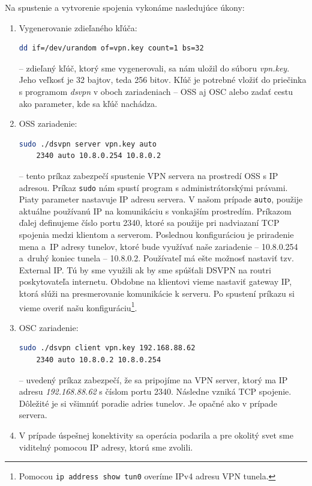 Na spustenie a vytvorenie spojenia vykonáme nasledujúce úkony:
\begin{enumerate}
	\item Vygenerovanie zdieľaného kľúča:\begin{lstlisting}[language=bash]
		dd if=/dev/urandom of=vpn.key count=1 bs=32
	\end{lstlisting} 
-- zdieľaný kľúč, ktorý sme vygenerovali, sa nám uložil do súboru \textit{vpn.key}. Jeho veľkosť je 32 bajtov, teda 256 bitov. Kľúč je potrebné vložiť do priečinka s programom \textit{dsvpn} v oboch zariadeniach -- OSS aj OSC alebo zadať cestu ako parameter, kde sa kľúč nachádza.
	\item OSS zariadenie: \begin{lstlisting}[language=bash] 
	sudo ./dsvpn server vpn.key auto 
	2340 auto 10.8.0.254 10.8.0.2
	\end{lstlisting} 
-- tento príkaz zabezpečí spustenie VPN servera na prostredí OSS s IP adresou. Príkaz \lstinline|sudo| nám spustí program s administrátorskými právami. Piaty parameter nastavuje IP adresu servera. V našom prípade \lstinline|auto|, použije aktuálne používanú IP na komunikáciu s vonkajším prostredím. Príkazom ďalej definujeme číslo portu 2340, ktoré sa použije pri nadviazaní TCP spojenia medzi klientom a serverom. Poslednou konfiguráciou je priradenie mena a~IP adresy tunelov, ktoré bude využívať naše zariadenie -- 10.8.0.254 a~druhý koniec tunela -- 10.8.0.2. Používateľ má ešte možnosť nastaviť tzv. External IP. Tú by sme využili ak by sme spúšťali DSVPN na routri poskytovateľa internetu. Obdobne na klientovi vieme nastaviť gateway IP, ktorá slúži na presmerovanie komunikácie k serveru. Po spustení príkazu si vieme overiť našu konfiguráciu\footnote{Pomocou \lstinline|ip address show tun0| overíme IPv4 adresu VPN tunela.}. 
	\item OSC zariadenie: \begin{lstlisting}[language=bash] 
	sudo ./dsvpn client vpn.key 192.168.88.62 
	2340 auto 10.8.0.2 10.8.0.254
	\end{lstlisting} 
-- uvedený príkaz zabezpečí, že sa pripojíme na VPN server, ktorý ma IP adresu \textit{192.168.88.62} s číslom portu 2340. Následne vzniká TCP spojenie. Dôležité je si všimnúť poradie adries tunelov. Je opačné ako v prípade servera. 
	\item V prípade úspešnej konektivity sa operácia podarila a pre okolitý svet sme viditelný pomocou IP adresy, ktorú sme zvolili. 
\end{enumerate}

